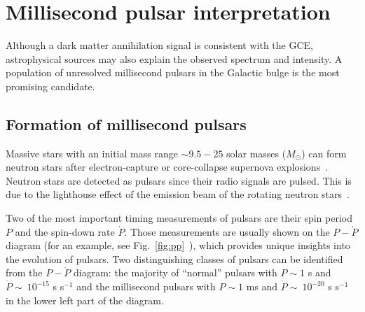 \documentclass[doublespace,nopageskip]{VTthesis} %
\begin{document}

\section{Millisecond pulsar interpretation}

Although a dark matter annihilation signal is consistent with the GCE,  astrophysical sources may also explain the observed spectrum and intensity. A population of unresolved millisecond pulsars in the Galactic bulge is the most promising candidate.

\subsection{Formation of millisecond pulsars}

Massive stars with an initial mass range $\sim 9.5 - 25$ solar masses ($M_\odot$) can form neutron stars after electron-capture or core-collapse supernova explosions~\cite{2014PASA...31...30K}. Neutron stars are detected as pulsars since their radio signals are pulsed. This is due to the lighthouse effect of the emission beam of the rotating neutron stars~\cite{2004hpa..book.....L}.

Two of the most important timing measurements of pulsars are their spin period $P$ and the spin-down rate $\dot{P}$. Those measurements are usually shown on the $P-\dot{P}$ diagram (for an example, see Fig.~\ref{fig:pp}~\cite{2011AIPC.1357..269T,2005AJ....129.1993M}), which provides unique insights into the evolution of pulsars. Two distinguishing classes of pulsars can be identified from the $P-\dot{P}$ diagram: the majority of ``normal'' pulsars with $P \sim 1$ s and $\dot{P} \sim\ 10^{-15}$ s s$^{-1}$ and the millisecond pulsars  with $P \sim 1$ ms and $\dot{P} \sim\ 10^{-20}$ s s$^{-1}$ in the lower left part of the diagram.
\end{document}
